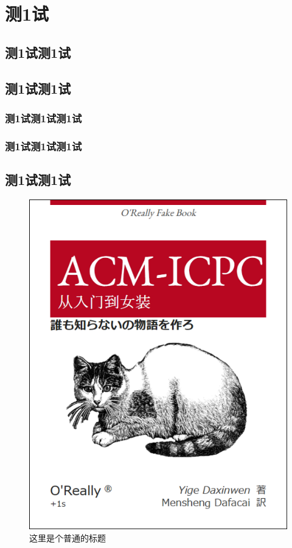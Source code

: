 \chapter{测1试}
\blindtext\cite{NWPUThesisLaTeXTemplate}
\section{测1试测1试}
\blindtext\cite{knuth1986the}\cite{lamport1989latex:}
\section{测1试测1试}
\blindtext
\subsection{测1试测1试测1试}
\blindtext
\subsection{测1试测1试测1试}
\blindtext
\section{测1试测1试}
\blindtext
\begin{figure}[ht]
	\centering
	\includegraphics[scale=0.6]{figures/figure1.png}
	\caption{
		这里是个普通的标题
	}
	\label{fig:example}
\end{figure}
\endinput